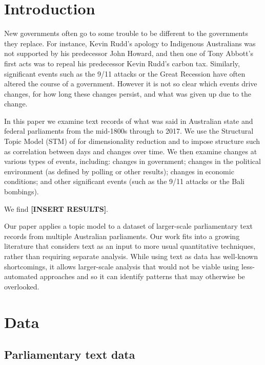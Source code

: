 \documentclass[12pt,]{article}
\theoremstyle{definition}
\theoremstyle{definition}
\theoremstyle{definition}
\theoremstyle{remark}
\begin{document}
\vskip 6.5pt


\noindent  \section{Introduction}\label{introduction}

New governments often go to some trouble to be different to the
governments they replace. For instance, Kevin Rudd's apology to
Indigenous Australians was not supported by his predecessor John Howard,
and then one of Tony Abbott's first acts was to repeal his predecessor
Kevin Rudd's carbon tax. Similarly, significant events such as the 9/11
attacks or the Great Recession have often altered the course of a
government. However it is not so clear which events drive changes, for
how long these changes persist, and what was given up due to the change.

In this paper we examine text records of what was said in Australian
state and federal parliaments from the mid-1800s through to 2017. We use
the Structural Topic Model (STM) of \citet{RobertsStewartAiroldi2016}
for dimensionality reduction and to impose structure such as correlation
between days and changes over time. We then examine changes at various
types of events, including: changes in government; changes in the
political environment (as defined by polling or other results); changes
in economic conditions; and other significant events (such as the 9/11
attacks or the Bali bombings).

We find \textbf{{[}INSERT RESULTS{]}}.

Our paper applies a topic model to a dataset of larger-scale
parliamentary text records from multiple Australian parliaments. Our
work fits into a growing literature that considers text as an input to
more usual quantitative techniques, rather than requiring separate
analysis. While using text as data has well-known shortcomings, it
allows larger-scale analysis that would not be viable using
less-automated approaches and so it can identify patterns that may
otherwise be overlooked.

\section{Data}\label{data}

\subsection{Parliamentary text data}\label{parliamentary-text-data}
\end{document}
